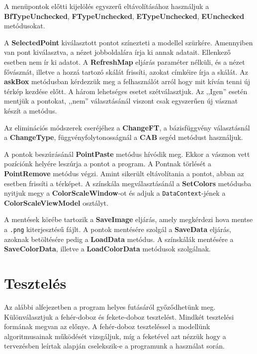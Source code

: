 				A menüpontok előtti kijelölés egyszerű eltávolításához használjuk a \textbf{BfTypeUnchecked}, \textbf{FTypeUnchecked}, \textbf{ETypeUnchecked}, \textbf{EUnchecked} metódusokat. 
				
				A \textbf{SelectedPoint} kiválasztott pontot színezteti a modellel szürkére. Amennyiben van pont kiválasztva, a nézet jobboldalára írja ki annak adatait. Ellenkező esetben nem ír ki adatot. A \textbf{RefreshMap} eljárás paraméter nélküli, és a nézet fővásznát, illetve a hozzá tartozó skálát frissíti, azokat címkéire írja a skálát. Az \textbf{askBox} metódusban kérdezzük meg a felhasználót arról hogy mit kíván tenni új térkép kezdése előtt. A három lehetséges esetet szétválasztjuk. Az ,,Igen'' esetén mentjük a pontokat, ,,nem'' választásánál viszont csak egyszerűen új vásznat készít a metódus.  
				 
				Az eliminációs módszerek cseréjéhez a \textbf{ChangeFT}, a bázisfüggvény választásnál a \textbf{ChangeType}, függvényfolytonosságnál a \textbf{CAB} segéd  metódust használjuk.
				
				A pontok beszúrásánál \textbf{PointPaste} metódus hívódik meg. Ekkor a vásznon vett pozíciónk helyére leszúrja a pontot a program. A Pontnak törlését a \textbf{PointRemove} metódus végzi. Amint sikerült eltávolítania a pontot, abban az esetben frissíti a térképet. A színskála megválasztásánál a \textbf{SetColors} metódusba nyitjuk megy a \textbf{ColorScaleWindow}-ot és adjuk a \texttt{DataContext}-jének a \textbf{ColorScaleViewModel} osztályt.
				
				A mentések körébe tartozik a \textbf{SaveImage} eljárás, amely megkérdezi hova mentse a \texttt{.png} kiterjesztésű fájlt. A pontok mentésére szolgál a \textbf{SaveData} eljárás, azoknak betöltésére pedig a \textbf{LoadData} metódus. A színskálák mentésére a \textbf{SaveColorData}, illetve a \textbf{LoadColorData} metódusok szolgálnak.
				
		\section{Tesztelés}
		
			Az alábbi alfejezetben a program helyes futásáról győződhetünk meg. Különválasztjuk a fehér-doboz és fekete-doboz tesztelést. Mindkét tesztelési formának megvan az előnye. A fehér-doboz teszteléssel a modellünk algoritmusainak működését vizsgáljuk, míg a feketével azt nézzük hogy a tervezésben leírtak alapján cselekszik-e a programunk a használat során.
			
